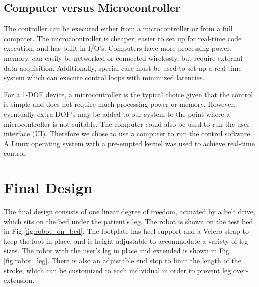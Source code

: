 \documentclass[12pt]{report}
\begin{document}
	
	\subsection{Computer versus Microcontroller}
	
	The controller can be executed either from a microcontroller or from a full computer. The microcoontroller is cheaper, easier to set up for real-time code execution, and has built in I/O's. Computers have more processing power, memory, can easily be networked or connected wirelessly, but require external data acquisition. Additionally, special care must be used to set up a real-time system which can execute control loops with minimized latencies. 
	
	For a 1-DOF device, a microcontroller is the typical choice given that the control is simple and does not require much processing power or memory. However, eventually extra DOF's may be added to our system to the point where a microcontroller is not suitable. The computer could also be used to run the user interface (UI). Therefore we chose to use a computer to run the control software. A Linux operating system with a pre-empted kernel was used to achieve real-time control.

\newpage

\section{Final Design} 

	The final design consists of one linear degree of freedom, actuated by a belt drive, which sits on the bed under the patient's leg. The robot is shown on the test bed in Fig.\ref{fig:robot_on_bed}. The footplate has heel support and a Velcro strap to keep the foot in place, and is height adjustable to accommodate a variety of leg sizes. The robot with the user's leg in place and extended is shown in Fig.\ref{fig:robot_leg}. There is also an adjustable end stop to limit the length of the stroke, which can be customized to each individual in order to prevent leg over-extension. 
\end{document}
